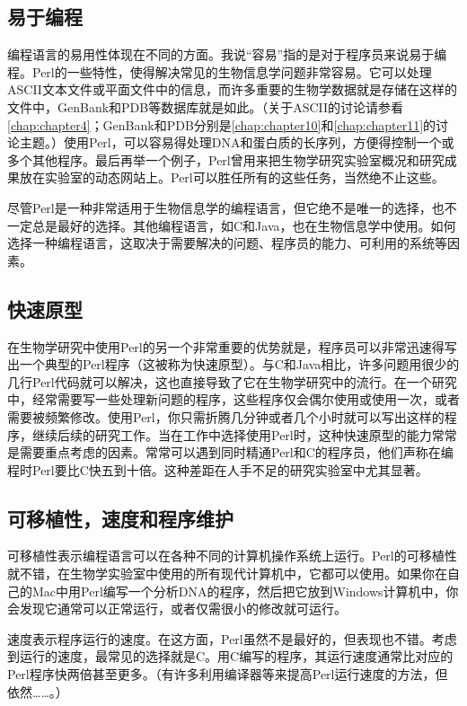 \subsection{易于编程}
编程语言的易用性体现在不同的方面。我说“容易”指的是对于程序员来说易于编程。Perl的一些特性，使得解决常见的生物信息学问题非常容易。它可以处理ASCII文本文件或平面文件中的信息，而许多重要的生物学数据就是存储在这样的文件中，GenBank和PDB等数据库就是如此。（关于ASCII的讨论请参看\autoref{chap:chapter4}；GenBank和PDB分别是\autoref{chap:chapter10}和\autoref{chap:chapter11}的讨论主题。）使用Perl，可以容易得处理DNA和蛋白质的长序列，方便得控制一个或多个其他程序。最后再举一个例子，Perl曾用来把生物学研究实验室概况和研究成果放在实验室的动态网站上。Perl可以胜任所有的这些任务，当然绝不止这些。

尽管Perl是一种非常适用于生物信息学的编程语言，但它绝不是唯一的选择，也不一定总是最好的选择。其他编程语言，如C和Java，也在生物信息学中使用。如何选择一种编程语言，这取决于需要解决的问题、程序员的能力、可利用的系统等因素。

\subsection{快速原型}
在生物学研究中使用Perl的另一个非常重要的优势就是，程序员可以非常迅速得写出一个典型的Perl程序（这被称为快速原型）。与C和Java相比，许多问题用很少的几行Perl代码就可以解决，这也直接导致了它在生物学研究中的流行。在一个研究中，经常需要写一些处理新问题的程序，这些程序仅会偶尔使用或使用一次，或者需要被频繁修改。使用Perl，你只需折腾几分钟或者几个小时就可以写出这样的程序，继续后续的研究工作。当在工作中选择使用Perl时，这种快速原型的能力常常是需要重点考虑的因素。常常可以遇到同时精通Perl和C的程序员，他们声称在编程时Perl要比C快五到十倍。这种差距在人手不足的研究实验室中尤其显著。

\subsection{可移植性，速度和程序维护}
可移植性表示编程语言可以在各种不同的计算机操作系统上运行。Perl的可移植性就不错，在生物学实验室中使用的所有现代计算机中，它都可以使用。如果你在自己的Mac中用Perl编写一个分析DNA的程序，然后把它放到Windows计算机中，你会发现它通常可以正常运行，或者仅需很小的修改就可运行。

速度表示程序运行的速度。在这方面，Perl虽然不是最好的，但表现也不错。考虑到运行的速度，最常见的选择就是C。用C编写的程序，其运行速度通常比对应的Perl程序快两倍甚至更多。（有许多利用编译器等来提高Perl运行速度的方法，但依然……。）

